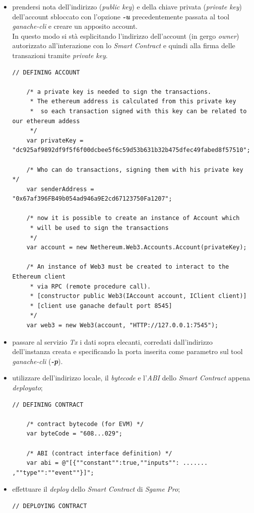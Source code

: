 \documentclass[11pt]{thesistemp}
\begin{document}
\begin{itemize}
	\item prendersi nota dell'indirizzo (\textit{public key}) e della chiave privata (\textit{private key}) dell'account sbloccato con l'opzione \textbf{\textit{-u}} precedentemente passata al tool \textit{ganache-cli} e creare un apposito account.\\
	In questo modo si stà esplicitando l'indirizzo dell'account (in gergo \textit{owner}) autorizzato all'interazione con lo \textit{Smart Contract} e quindi alla firma delle transazioni tramite \textit{private key}.
	\begin{lstlisting}
// DEFINING ACCOUNT

    /* a private key is needed to sign the transactions.
     * The ethereum address is calculated from this private key 
     *  so each transaction signed with this key can be related to our ethereum addess
     */
    var privateKey = "dc925af9892df9f5f6f00dcbee5f6c59d53b631b32b475dfec49fabed8f57510";

    /* Who can do transactions, signing them with his private key */
    var senderAddress = "0x67af396FB49b054ad946a9E2cd67123750Fa1207";

    /* now it is possible to create an instance of Account which 
     * will be used to sign the transactions
     */
    var account = new Nethereum.Web3.Accounts.Account(privateKey);

    /* An instance of Web3 must be created to interact to the Ethereum client 
     * via RPC (remote procedure call).
     * [constructor public Web3(IAccount account, IClient client)] 
     * [client use ganache default port 8545] 
     */
    var web3 = new Web3(account, "HTTP://127.0.0.1:7545");
	\end{lstlisting}
	\item passare al servizio  \textit{Tx} i dati sopra elecanti, corredati dall'indirizzo dell'instanza creata e specificando la porta inserita come parametro sul tool \textit{ganache-cli} (\textbf{\textit{-p}}).
	\pagebreak
	\item utilizzare dell'indirizzo locale, il \textit{bytecode} e l'\textit{ABI} dello \textit{Smart Contract} appena \textit{deployato};
	\begin{lstlisting}
// DEFINING CONTRACT

    /* contract bytecode (for EVM) */
    var byteCode = "608...029";

    /* ABI (contract interface definition) */
    var abi = @"[{""constant"":true,""inputs"": ....... ,""type"":""event""}]";
	\end{lstlisting}
	\item effettuare il \textit{deploy} dello \textit{Smart Contract} di \textit{Sgame Pro};
	\begin{lstlisting}
// DEPLOYING CONTRACT


\end{lstlisting}
\end{itemize}
\end{document}
